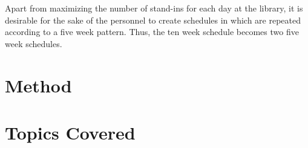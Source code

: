 Apart from maximizing the number of stand-ins for each day at the library, it is desirable for the sake of the personnel to create schedules in which are repeated according to a five week pattern. Thus, the ten week schedule becomes two five week schedules. 

\section{Method}



\section{Topics Covered}













\iffalse



